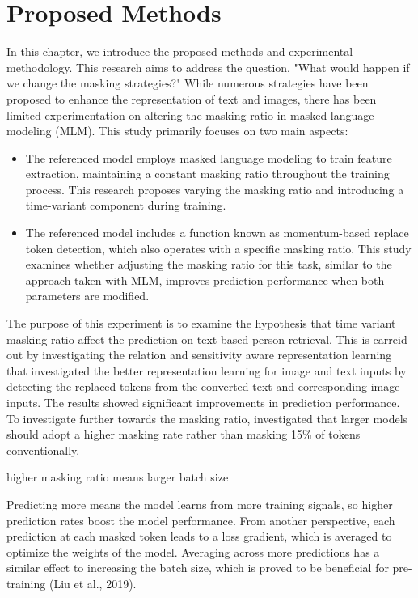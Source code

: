 \chapter{Proposed Methods}
In this chapter, we introduce the proposed methods and experimental methodology. This research aims to address the question, "What would happen if we change the masking strategies?" While numerous strategies have been proposed to enhance the representation of text and images, there has been limited experimentation on altering the masking ratio in masked language modeling (MLM). This study primarily focuses on two main aspects:

\begin{itemize}
  \item The referenced model employs masked language modeling to train feature extraction, maintaining a constant masking ratio throughout the training process. This research proposes varying the masking ratio and introducing a time-variant component during training.
  \item The referenced model includes a function known as momentum-based replace token detection, which also operates with a specific masking ratio. This study examines whether adjusting the masking ratio for this task, similar to the approach taken with MLM, improves prediction performance when both parameters are modified.
\end{itemize}


The purpose of this experiment is to examine the hypothesis that time variant masking ratio affect the prediction on text based person retrieval.
This is carreid out by investigating the relation and sensitivity aware representation learning \cite{Bai2023RaSaRA} that investigated the better representation learning for image and text inputs by detecting the replaced tokens from the converted text and corresponding image inputs. The results showed significant improvements in prediction performance. To investigate further towards the masking ratio, \cite{wettig-etal-2023-mask} investigated that larger models should adopt a higher masking rate rather than masking 15\% of tokens conventionally.

higher masking ratio means larger batch size

Predicting more means the model learns from more training signals, so higher prediction rates boost the model performance. From another perspective, each prediction at each masked token leads to a loss gradient, which is averaged to optimize the weights of the model. Averaging across more predictions has a similar effect to increasing the batch size, which is proved to be beneficial for pre-training (Liu et al., 2019). 

